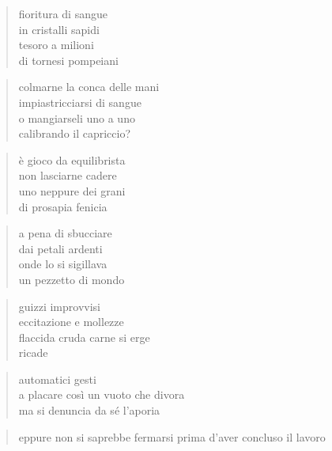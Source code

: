 \clearpage


	\begin{verse}
		fioritura di sangue\\
		in cristalli sapidi\\
		tesoro a milioni\\
		di tornesi pompeiani
	\end{verse}

	\begin{verse}
		colmarne la conca delle mani\\
		impiastricciarsi di sangue\\
		o mangiarseli uno a uno\\
		calibrando il capriccio?
	\end{verse}

	\begin{verse}
		è gioco da equilibrista\\
		non lasciarne cadere\\
		uno neppure dei grani\\
		di prosapia fenicia
	\end{verse}

	\begin{verse}
		a pena di sbucciare\\
		dai petali ardenti\\
		onde lo si sigillava\\
		un pezzetto di mondo
	\end{verse}

\clearpage


	\begin{verse}
                guizzi improvvisi\\
                eccitazione e mollezze\\
                flaccida cruda carne si erge\\
                ricade
	\end{verse}

	\begin{verse}
                automatici gesti\\
                a placare così un vuoto che divora\\
                ma si denuncia da sé l’aporia
	\end{verse}

	\begin{verse}
                eppure non si saprebbe fermarsi prima d’aver concluso il lavoro
	\end{verse}

